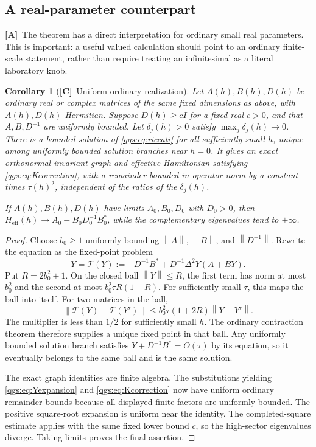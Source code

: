 \documentclass[11pt,oneside]{article}
\numberwithin{equation}{section}
\theoremstyle{plain}
\newtheorem{corollary}[corollary]{Corollary}
\theoremstyle{definition}
\theoremstyle{remark}
\newcommand{\Heff}{H_{\mathrm{eff}}}
\newcommand{\norm}[1]{\left\|#1\right\|}
\newcommand{\TC}{\textcolor{TierC}{\textsf{\bfseries[C]}}}
\newcommand{\TA}{\textcolor{TierA}{\textsf{\bfseries[A]}}}
\begin{document}
\subsection{A real-parameter counterpart}
\TA\ The theorem has a direct interpretation for ordinary small real parameters. This is important: a useful valued calculation should point to an ordinary finite-scale statement, rather than require treating an infinitesimal as a literal laboratory knob.

\begin{corollary}[\TC\ Uniform ordinary realization]\label{qgs:cor:realrealization}
Let $A(h),B(h),D(h)$ be ordinary real or complex matrices of the same fixed dimensions as above, with $A(h),D(h)$ Hermitian. Suppose $D(h)\ge cI$ for a fixed real $c>0$, and that $A,B,D^{-1}$ are uniformly bounded. Let $\delta_j(h)>0$ satisfy $\max_j\delta_j(h)\to0$. There is a bounded solution of \eqref{qgs:eq:riccati} for all sufficiently small $h$, unique among uniformly bounded solution branches near $h=0$. It gives an exact orthonormal invariant graph and effective Hamiltonian satisfying \eqref{qgs:eq:Kcorrection}, with a remainder bounded in operator norm by a constant times $\tau(h)^2$, independent of the ratios of the $\delta_j(h)$.

If $A(h),B(h),D(h)$ have limits $A_0,B_0,D_0$ with $D_0>0$, then $\Heff(h)\to A_0-B_0D_0^{-1}B_0^*$, while the complementary eigenvalues tend to $+\infty$.
\end{corollary}
\begin{proof}
Choose $b_0\ge1$ uniformly bounding $\norm A$, $\norm B$, and $\norm{D^{-1}}$. Rewrite the equation as the fixed-point problem
\[
 Y=\mathcal T(Y):=-D^{-1}B^*+D^{-1}\Delta^2Y(A+BY).
\]
Put $R=2b_0^2+1$. On the closed ball $\norm Y\le R$, the first term has norm at most $b_0^2$ and the second at most $b_0^2\tau R(1+R)$. For sufficiently small $\tau$, this maps the ball into itself. For two matrices in the ball,
\[
 \norm{\mathcal T(Y)-\mathcal T(Y')}
 \le b_0^2\tau(1+2R)\norm{Y-Y'}.
\]
The multiplier is less than $1/2$ for sufficiently small $h$. The ordinary contraction theorem therefore supplies a unique fixed point in that ball. Any uniformly bounded solution branch satisfies $Y+D^{-1}B^*=O(\tau)$ by its equation, so it eventually belongs to the same ball and is the same solution.

The exact graph identities are finite algebra. The substitutions yielding \eqref{qgs:eq:Yexpansion} and \eqref{qgs:eq:Kcorrection} now have uniform ordinary remainder bounds because all displayed finite factors are uniformly bounded. The positive square-root expansion is uniform near the identity. The completed-square estimate applies with the same fixed lower bound $c$, so the high-sector eigenvalues diverge. Taking limits proves the final assertion.
\end{proof}
\end{document}
